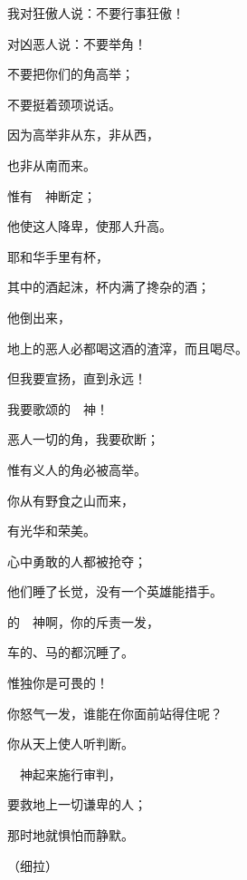 {\BB \par }{\Q {}我对狂傲人说：不要行事狂傲！
\par }{\Q 对凶恶人说：不要举角！
\par }{\Q {}不要把你们的角高举；
\par }{\Q 不要挺着颈项说话。
\par }{\Q {}因为高举非从东，非从西，
\par }{\Q 也非从南而来。
\par }{\Q {}惟有　神断定；
\par }{\Q 他使这人降卑，使那人升高。
\par }{\Q {}耶和华手里有杯，
\par }{\Q 其中的酒起沫，杯内满了搀杂的酒；
\par }{\Q 他倒出来，
\par }{\Q 地上的恶人必都喝这酒的渣滓，而且喝尽。
\par }{\BB \par }{\Q {}但我要宣扬，直到永远！
\par }{\Q 我要歌颂{}的　神！
\par }{\Q {}恶人一切的角，我要砍断；
\par }{\Q 惟有义人的角必被高举。

\par }
{\BB \par }{\Q {}你从有野食之山而来，
\par }{\Q 有光华和荣美。
\par }{\Q {}心中勇敢的人都被抢夺；
\par }{\Q 他们睡了长觉，没有一个英雄能措手。
\par }{\Q {}的　神啊，你的斥责一发，
\par }{车的、{}马的都沉睡了。
\par }{\BB \par }{\Q {}惟独你是可畏的！
\par }{\Q 你怒气一发，谁能在你面前站得住呢？
\par }{\Q {}你从天上使人听判断。
\par }{\Q 　神起来施行审判，
\par }{\Q 要救地上一切谦卑的人；
\par }{\Q 那时地就惧怕而静默。
\par }{\QS （细拉）
\par }
